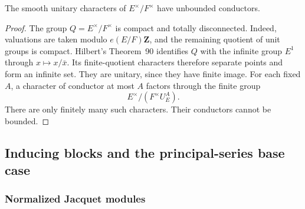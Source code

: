 \begin{lemma}\label{ana:characters}
The smooth unitary characters of $E^\times/F^\times$ have
unbounded conductors.
\end{lemma}

\begin{proof}
The group $Q=E^\times/F^\times$ is compact and totally
disconnected. Indeed, valuations are taken modulo
$e(E/F)\mathbf Z$, and the remaining quotient of unit groups is
compact. Hilbert's Theorem~90 identifies $Q$ with the infinite
group $E^1$ through $x\mapsto x/\bar x$.
Its finite-quotient characters therefore separate points and
form an infinite set. They are unitary, since they have finite
image. For each fixed $A$, a character of conductor at most $A$
factors through the finite group
\[
 E^\times/(F^\times U_E^A).
\]
There are only finitely many such characters. Their conductors
cannot be bounded.
\end{proof}

\subsection{Inducing blocks and the principal-series base case}
\label{blk:section}

\subsubsection{Normalized Jacquet modules}

